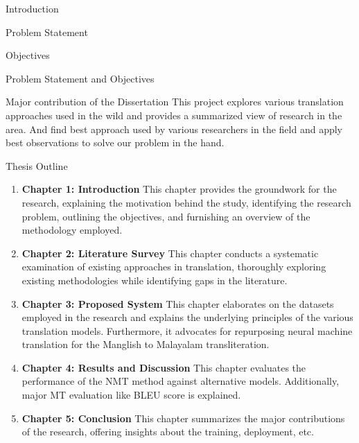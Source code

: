 \begin{chapter}{Introduction}
\begin{section}{Problem Statement}
\begin{subsection}{Objectives}
        \end{subsection}
    \end{section}{Problem Statement and Objectives}

    \begin{section}{Major contribution of the Dissertation}
        This project explores various translation approaches used in the wild and provides a summarized view of research in the area. And find best approach used by various researchers in the field and apply best observations to solve our problem in the hand.
    \end{section}
    \begin{section}{Thesis Outline}
    \begin{enumerate} 
    \item \textbf{Chapter 1: Introduction} This chapter provides the groundwork for the research, explaining the motivation behind the study, identifying the research problem, outlining the objectives, and furnishing an overview of the methodology employed. \item \textbf{Chapter 2: Literature Survey} This chapter conducts a systematic examination of existing approaches in translation, thoroughly exploring existing methodologies while identifying gaps in the literature. 
    \item \textbf{Chapter 3: Proposed System} This chapter elaborates on the datasets employed in the research and explains the underlying principles of the various translation models. Furthermore, it advocates for repurposing neural machine translation for the Manglish to Malayalam transliteration. 
    \item \textbf{Chapter 4: Results and Discussion} This chapter evaluates the performance of the NMT method against alternative models. Additionally, major MT evaluation like BLEU score is explained. 
    \item \textbf{Chapter 5: Conclusion} This chapter summarizes the major contributions of the research, offering insights about the training, deployment, etc.
\end{enumerate}
    \end{section}
\end{chapter}